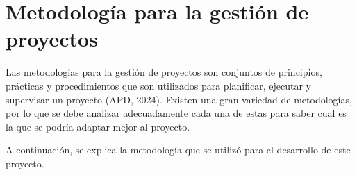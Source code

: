 \section{Metodología para la gestión de proyectos}
Las metodologías para la gestión de proyectos son conjuntos de principios, prácticas y procedimientos que son utilizados para planificar, ejecutar y supervisar un proyecto (APD, 2024). Existen una gran variedad de metodologías, por lo que se debe analizar adecuadamente cada una de estas para saber cual es la que se podría adaptar mejor al proyecto.

A continuación, se explica la metodología que se utilizó para el desarrollo de este proyecto.
    